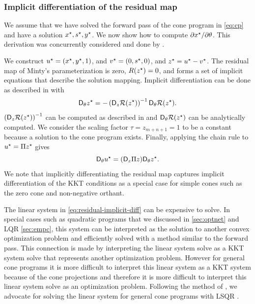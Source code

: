 \subsubsection{Implicit differentiation of the residual map}
We assume that we have solved the forward pass of the
cone program in \cref{eq:cp} and have a solution
${x^\star}, {s^\star}, {y^\star}$.
We now show how to compute
$\partial {x^\star}/\partial \theta$.
This derivation was concurrently considered and done by
\citet{agrawal2019differentiating}.

We construct ${u^\star}=({x^\star}, {y^\star}, 1)$,
and ${v^\star}=(0,{s^\star}, 0)$, and ${z^\star}={u^\star}-{v^\star}$.
The residual map of Minty's parameterization is zero,
$R({z^\star})=0$, and forms a set of
implicit equations that describe the solution mapping.
Implicit differentiation can be done as described in
\citet{dontchev2009implicit} with
\begin{equation}
  \label{eq:residual-implicit-diff}
  \mathsf{D}_\theta {z^\star} =
    -\left(\mathsf{D}_z \mathcal{R}({z^\star})\right)^{-1}
    \mathsf{D}_\theta \mathcal{R}({z^\star}).
\end{equation}
$\left(\mathsf{D}_z \mathcal{R}({z^\star})\right)^{-1}$ can be computed
as described in \citep{busseti2018solution}
and $\mathsf{D}_\theta \mathcal{R}({z^\star})$ can be analytically computed.
We consider the scaling factor $\tau=z_{m+n+1}=1$ to be
a constant because a solution to the cone program exists.
Finally, applying the chain rule to ${u^\star}=\Pi {z^\star}$
gives
\begin{equation}
  \mathsf{D}_\theta {u^\star} = (\mathsf{D}_z \Pi z) \mathsf{D}_\theta {z^\star}.
\end{equation}
We note that implicitly differentiating the residual
map captures implicit differentiation of the KKT conditions
as a special case for simple cones such as the zero cone
and non-negative orthant.

The linear system in \cref{eq:residual-implicit-diff}
can be expensive to solve.
In special cases such as quadratic programs
that we discussed in \cref{sec:optnet}
and LQR \cref{sec:empc}, this system can be interpreted
as the solution to another convex optimization problem
and efficiently solved with a method similar to the
forward pass.
This connection is made by interpreting the linear system
solve as a KKT system solve that represents another
optimization problem.
However for general cone programs it is more difficult
to interpret this linear system as a KKT system
because of the cone projections and therefore it
is more difficult to interpret this linear system
solve as an optimization problem.
Following the method of \citet{busseti2018solution},
we advocate for solving the linear system for general
cone programs with LSQR \citep{paige1982lsqr}.

